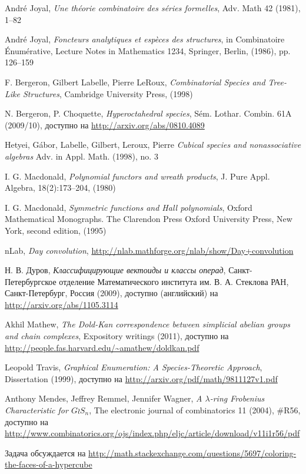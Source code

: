 \begin{thebibliography}{9}

 André Joyal, \emph{Une théorie combinatoire des séries
formelles}, Adv. Math 42 (1981), 1–82

 André Joyal, \emph{Foncteurs analytiques et espèces des
structures}, in Combinatoire Énumérative, Lecture Notes in Mathematics 1234, Springer,
Berlin, (1986), pp. 126–159

 F. Bergeron, Gilbert Labelle, Pierre LeRoux,
\emph{Combinatorial Species and Tree-Like Structures}, Cambridge University Press, (1998)

 N. Bergeron, P. Choquette,
\emph{Hyperoctahedral species}, Sém. Lothar. Combin. 61A (2009/10), доступно на
\url{http://arxiv.org/abs/0810.4089}

 Hetyei, Gábor, Labelle, Gilbert,
Leroux, Pierre \emph{Cubical species and nonassociative algebras} Adv. in Appl.
Math. (1998), no. 3

 I. G. Macdonald, \emph{Polynomial functors and wreath
products}, J. Pure Appl. Algebra, 18(2):173–204, (1980)

 I. G. Macdonald, \emph{Symmetric functions and Hall polynomials},
Oxford Mathematical Monographs.
The Clarendon Press Oxford University Press, New York, second edition, (1995)

 nLab, \emph{Day convolution},
\url{http://nlab.mathforge.org/nlab/show/Day+convolution}

 Н. В. Дуров, \emph{Классифицирующие вектоиды и классы операд},
Санкт-Петербургское отделение Математического института им. В. А. Стеклова РАН,
Санкт-Петербург, Россия (2009), доступно (английский) на
\url{http://arxiv.org/abs/1105.3114}

 Akhil Mathew, \emph{The Dold-Kan correspondence between
simplicial abelian groups and chain complexes}, Expository writings (2011),
доступно на \url{http://people.fas.harvard.edu/~amathew/doldkan.pdf}

 Leopold Travis, \emph{Graphical Enumeration: A
Species-Theoretic Approach}, Dissertation (1999), доступно на
\url{http://arxiv.org/pdf/math/9811127v1.pdf}

 Anthony Mendes, Jeffrey Remmel, Jennifer Wagner,
\emph{A $\lambda$-ring Frobenius Characteristic for $G \wr S_n$}, The electronic
journal of combinatorics 11 (2004), \#R56, доступно на 
\url{http://www.combinatorics.org/ojs/index.php/eljc/article/download/v11i1r56/pdf}

 Задача обсуждается на
\url{http://math.stackexchange.com/questions/5697/coloring-the-faces-of-a-hypercube}

\end{thebibliography}